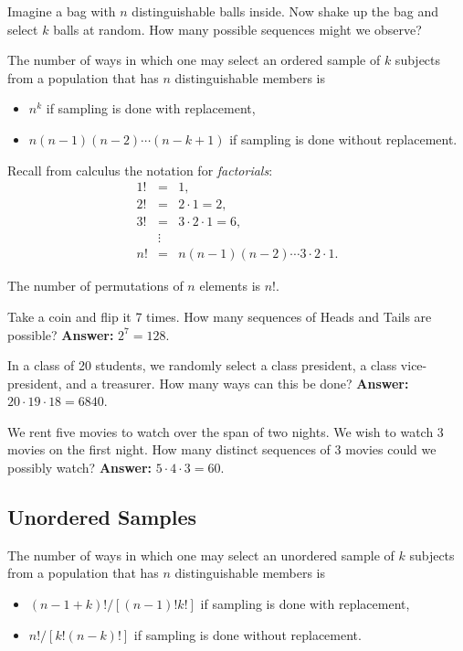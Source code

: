 Imagine a bag with \(n\) distinguishable balls inside. Now shake up
the bag and select \(k\) balls at random. How many possible sequences
might we observe?

\begin{prop}
The number of ways in which one may select an ordered sample of \(k\)
subjects from a population that has \(n\) distinguishable members is
\begin{itemize}
\item \(n^{k}\) if sampling is done with replacement,
\item \(n(n-1)(n-2)\cdots(n-k+1)\) if sampling is done without
replacement.
\end{itemize}
\end{prop}

Recall from calculus the notation for \emph{factorials}: 
\begin{eqnarray*}
1! & = & 1,\\
2! & = & 2 \cdot 1 = 2,\\
3! & = & 3 \cdot 2 \cdot 1 = 6,\\
 & \vdots\\
n! & = & n(n - 1)(n - 2) \cdots 3 \cdot 2 \cdot 1.
\end{eqnarray*}

\begin{fact}
The number of permutations of \(n\) elements is \(n!\).
\end{fact}


Take a coin and flip it 7 times. How many sequences of Heads and Tails
are possible? \textbf{Answer:} \(2^{7}=128\).



In a class of 20 students, we randomly select a class president, a
class vice-president, and a treasurer. How many ways can this be
done? \textbf{Answer:} \(20\cdot19\cdot18=6840\).



We rent five movies to watch over the span of two nights. We wish to
watch 3 movies on the first night. How many distinct sequences of 3
movies could we possibly watch? \textbf{Answer:} \(5\cdot4\cdot3=60\).

\subsection{Unordered Samples}
\label{sec-4-5-2}

\begin{prop}
The number of ways in which one may select an unordered sample of
\(k\) subjects from a population that has \(n\) distinguishable
members is
\begin{itemize}
\item \((n-1+k)!/[(n-1)!k!]\) if sampling is done with replacement,
\item \(n!/[k!(n-k)!]\) if sampling is done without replacement.
\end{itemize}
\end{prop}

